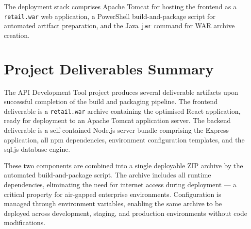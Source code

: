 The deployment stack comprises Apache Tomcat for hosting the frontend as a \texttt{retail.war} web application, a PowerShell build-and-package script for automated artifact preparation, and the Java \texttt{jar} command for WAR archive creation.

\section{Project Deliverables Summary}

The API Development Tool project produces several deliverable artifacts upon successful completion of the build and packaging pipeline. The frontend deliverable is a \texttt{retail.war} archive containing the optimised React application, ready for deployment to an Apache Tomcat application server. The backend deliverable is a self-contained Node.js server bundle comprising the Express application, all npm dependencies, environment configuration templates, and the sql.js database engine.

These two components are combined into a single deployable ZIP archive by the automated build-and-package script. The archive includes all runtime dependencies, eliminating the need for internet access during deployment --- a critical property for air-gapped enterprise environments. Configuration is managed through environment variables, enabling the same archive to be deployed across development, staging, and production environments without code modifications.
